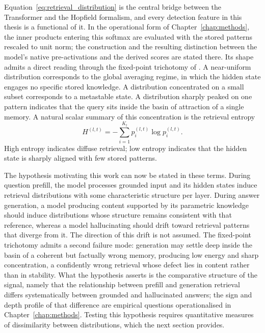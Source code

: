 Equation~\eqref{eq:retrieval_distribution} is the central bridge between the
Transformer and the Hopfield formalism, and every detection feature in this
thesis is a functional of it. In the operational form of
Chapter~\ref{chap:methods}, the inner products entering this softmax are
evaluated with the stored patterns rescaled to unit norm; the construction
and the resulting distinction between the model's native pre-activations and
the derived scores are stated there. Its shape admits a direct reading through the
fixed-point trichotomy of \citet{ramsauer2020hopfield}. A near-uniform
distribution corresponds to the global averaging regime, in which the hidden
state engages no specific stored knowledge. A distribution concentrated on a
small subset corresponds to a metastable state. A distribution sharply peaked
on one pattern indicates that the query sits inside the basin of attraction of
a single memory. A natural scalar summary of this concentration is the
retrieval entropy
\begin{equation}
    H^{(l,t)}
    =
    -\sum_{i=1}^{K_l} p_i^{(l,t)} \log p_i^{(l,t)}.
    \label{eq:retrieval_entropy}
\end{equation}
High entropy indicates diffuse retrieval; low entropy indicates that the
hidden state is sharply aligned with few stored patterns.

The hypothesis motivating this work can now be stated in these terms. During
question prefill, the model processes grounded input and its hidden states
induce retrieval distributions with some characteristic structure per layer.
During answer generation, a model producing content supported by its
parametric knowledge should induce distributions whose structure remains
consistent with that reference, whereas a model hallucinating should drift
toward retrieval patterns that diverge from it. The direction of this drift
is not assumed. The fixed-point trichotomy admits a second failure mode:
generation may settle deep inside the basin of a coherent but factually
wrong memory, producing low energy and sharp concentration, a confidently
wrong retrieval whose defect lies in content rather than in stability. What
the hypothesis asserts is the comparative
structure of the signal, namely that the relationship between prefill and
generation retrieval differs systematically between grounded and hallucinated
answers; the sign and depth profile of that difference are empirical
questions operationalised in Chapter~\ref{chap:methods}. Testing this hypothesis
requires quantitative measures of dissimilarity between distributions, which
the next section provides.

